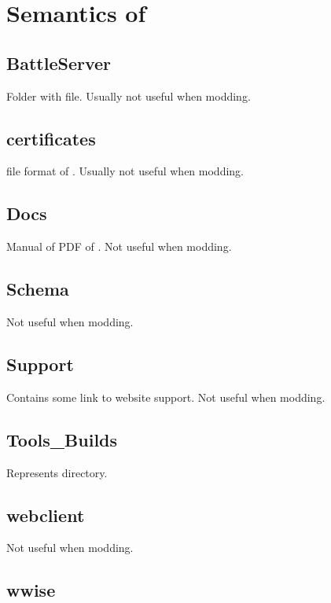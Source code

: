 \chapter{Semantics of \aoeexedir{}}
    \label{chp:semantics}
    
    \section{BattleServer}

    Folder with  file. Usually not useful when modding.

    \section{certificates}

     file format of \aoe{}. Usually not useful when modding.

    \section{Docs}

    Manual of PDF of \aoe{}. Not useful when modding.

    \section{Schema}

    Not useful when modding.

    \section{Support}

    Contains some link to \aoe{} website support. Not useful when modding.

    \section{Tools\_Builds}

    Represents \genie{} directory.

    \section{webclient}

    Not useful when modding.

    \section{wwise}

